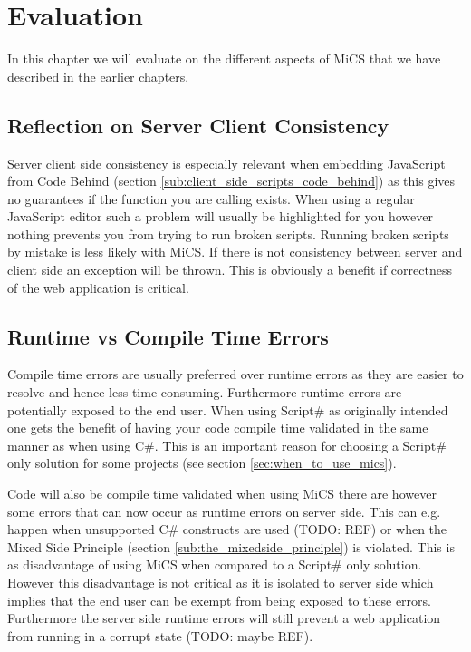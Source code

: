 \chapter{Evaluation}
	In this chapter we will evaluate on the different aspects of MiCS that we have described in the earlier chapters.







\section{Reflection on Server Client Consistency} %
\label{sec:reflection_on_server_client_consistency}
	Server client side consistency is especially relevant when embedding JavaScript from Code Behind (section \ref{sub:client_side_scripts_code_behind}) as this gives no guarantees if the function you are calling exists. When using a regular JavaScript editor such a problem will usually be highlighted for you however nothing prevents you from trying to run broken scripts. Running broken scripts by mistake is less likely with MiCS. If there is not consistency between server and client side an exception will be thrown. This is obviously a benefit if correctness of the web application is critical.

\section{Runtime vs Compile Time Errors} %
\label{sec:runtime_vs_compile_time_errors}
	Compile time errors are usually preferred over runtime errors as they are easier to resolve and hence less time consuming. Furthermore runtime errors are potentially exposed to the end user.  When using Script\# as originally intended one gets the benefit of having your code compile time validated in the same manner as when using C\#. This is an important reason for choosing a Script\# only solution for some projects (see section \ref{sec:when_to_use_mics}).

	Code will also be compile time validated when using MiCS there are however some errors that can now occur as runtime errors on server side. This can e.g. happen when unsupported C\# constructs are used (TODO: REF) or when the Mixed Side Principle (section \ref{sub:the_mixedside_principle}) is violated. This is as disadvantage of using MiCS when compared to a Script\# only solution. However this disadvantage is not critical as it is isolated to server side which implies that the end user can be exempt from being exposed to these errors. Furthermore the server side runtime errors will still prevent a web application from running in a corrupt state (TODO: maybe REF). 

